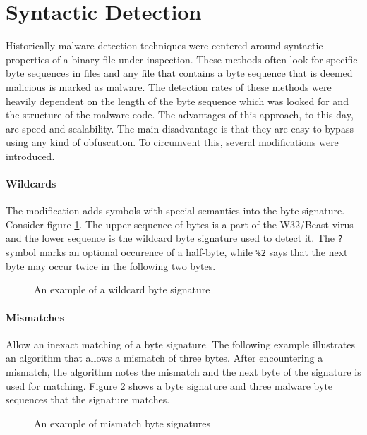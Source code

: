 \section{Syntactic Detection}
Historically malware detection techniques were centered around syntactic properties of a binary file under inspection. These methods often look for specific byte sequences in files and any file that contains a byte sequence that is deemed malicious is marked as malware. The detection rates of these methods were heavily dependent on the length of the byte sequence which was looked for and the structure of the malware code. The advantages of this approach, to this day, are speed and scalability. The main disadvantage is that they are easy to bypass using any kind of obfuscation. To circumvent this, several modifications were introduced.

\paragraph*{Wildcards} The modification adds symbols with special semantics into the byte signature. Consider figure \ref{fig_wildcards}. The upper sequence of bytes is a part of the W32/Beast virus and the lower sequence is the wildcard byte signature used to detect it. The \texttt{?} symbol marks an optional occurence of a half-byte, while \texttt{\%2} says that the next byte may occur twice in the following two bytes.

\begin{figure}[H]
    \centering
    \caption{An example of a wildcard byte signature}
    \label{fig_wildcards}
\end{figure}

\paragraph*{Mismatches} Allow an inexact matching of a byte signature. The following example illustrates an algorithm that allows a mismatch of three bytes. After encountering a mismatch, the algorithm notes the mismatch and the next byte of the signature is used for matching. Figure \ref{fig_mismatch} shows a byte signature and three malware byte sequences that the signature matches.

\begin{figure}[H]
    \centering
    \caption{An example of mismatch byte signatures}
    \label{fig_mismatch}
\end{figure}

